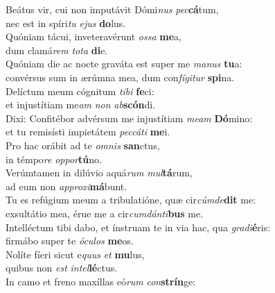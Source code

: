 \evenverse Beátus vir, cui non imputávit Dómi\textit{nus} \textit{pec}\textbf{cá}tum,~\*\\
\evenverse nec est in spíri\textit{tu} \textit{e}\textit{jus} \textbf{do}lus.\\
\oddverse Quóniam tácui, inveteravérunt \textit{os}\textit{sa} \textbf{me}a,~\*\\
\oddverse dum clamá\textit{rem} \textit{to}\textit{ta} \textbf{di}e.\\
\evenverse Quóniam die ac nocte graváta est super me \textit{ma}\textit{nus} \textbf{tu}a:~\*\\
\evenverse convérsus sum in ærúmna mea, dum con\textit{fí}\textit{gi}\textit{tur} \textbf{spi}na.\\
\oddverse Delíctum meum cógnitum \textit{ti}\textit{bi} \textbf{fe}ci:~\*\\
\oddverse et injustítiam me\textit{am} \textit{non} \textit{ab}\textbf{scón}di.\\
\evenverse Dixi: Confitébor advérsum me injustítiam \textit{me}\textit{am} \textbf{Dó}mino:~\*\\
\evenverse et tu remisísti impietátem \textit{pec}\textit{cá}\textit{ti} \textbf{me}i.\\
\oddverse Pro hac orábit ad te \textit{om}\textit{nis} \textbf{san}ctus,~\*\\
\oddverse in témpo\textit{re} \textit{op}\textit{por}\textbf{tú}no.\\
\evenverse Verúmtamen in dilúvio aquá\textit{rum} \textit{mul}\textbf{tá}rum,~\*\\
\evenverse ad eum non \textit{ap}\textit{pro}\textit{xi}\textbf{má}bunt.\\
\oddverse Tu es refúgium meum a tribulatióne, quæ cir\textit{cúm}\textit{de}\textbf{dit} me:~\*\\
\oddverse exsultátio mea, érue me a cir\textit{cum}\textit{dán}\textit{ti}\textbf{bus} me.\\
\evenverse Intelléctum tibi dabo, et ínstruam te in via hac, qua \textit{gra}\textit{di}\textbf{é}ris:~\*\\
\evenverse firmábo super te \textit{ó}\textit{cu}\textit{los} \textbf{me}os.\\
\oddverse Nolíte fíeri sicut e\textit{quus} \textit{et} \textbf{mu}lus,~\*\\
\oddverse quibus non \textit{est} \textit{in}\textit{tel}\textbf{lé}ctus.\\
\evenverse In camo et freno maxíllas eó\textit{rum} \textit{con}\textbf{strín}ge:~\*\\
